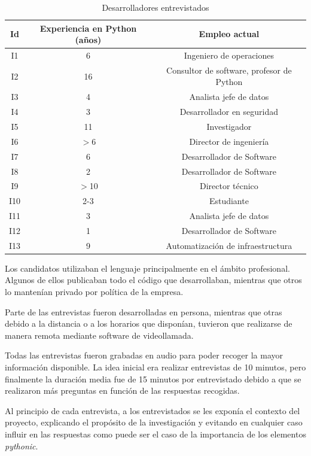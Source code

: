 \documentclass[a4paper, 12pt]{book}
\begin{document}
\begin{table}
\begin{center}
\begin{tabular} { | c | c | c | }
\hline
\textbf{Id} & \textbf{Experiencia en Python (años)} & \textbf{Empleo actual} \\
\hline
I1 &  6 & Ingeniero de operaciones \\
I2 & 16 & Consultor de software, profesor de Python \\
I3 &  4 & Analista jefe de datos \\
I4 &  3 & Desarrollador en seguridad \\
I5 & 11 & Investigador \\
I6 & $>$6 & Director de ingeniería \\
I7 &  6 & Desarrollador de Software \\
I8 &  2  & Desarrollador de Software \\
I9 & $>$10 & Director técnico \\
I10 & 2-3 & Estudiante \\
I11 & 3 & Analista jefe de datos \\
I12 & 1 & Desarrollador de Software \\
I13 & 9 & Automatización de infraestructura \\ 
\hline
\end{tabular}
\caption{Desarrolladores entrevistados}
\label{table:desarroladores}
\end{center}
\end{table}

Los candidatos utilizaban el lenguaje principalmente en el ámbito profesional. Algunos de ellos publicaban todo el código que desarrollaban, mientras que otros lo mantenían privado por política de la empresa.

Parte de las entrevistas fueron desarrolladas en persona, mientras que otras debido a la distancia o a los horarios que disponían, tuvieron que realizarse de manera remota mediante software de videollamada.

Todas las entrevistas fueron grabadas en audio para poder recoger la mayor información disponible. La idea inicial era realizar entrevistas de 10 minutos, pero finalmente la duración media fue de 15 minutos por entrevistado debido a que se realizaron más preguntas en función de las respuestas recogidas.

Al principio de cada entrevista, a los entrevistados se les exponía el contexto del proyecto, explicando el propósito de la investigación y evitando en cualquier caso influir en las respuestas como puede ser el caso de la importancia de los elementos \textit{pythonic}.
\end{document}
